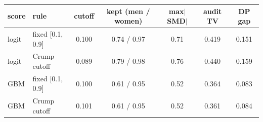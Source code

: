 \begin{tabular}{llccccc}
\toprule
score & rule & cutoff & kept (men / women) & max$|$SMD$|$ & audit TV & DP gap \\
\midrule
logit & fixed $[$0.1, 0.9$]$ & 0.100 & 0.74 / 0.97 & 0.71 & 0.419 & 0.151 \\
logit & Crump cutoff & 0.089 & 0.79 / 0.98 & 0.76 & 0.440 & 0.159 \\
GBM & fixed $[$0.1, 0.9$]$ & 0.100 & 0.61 / 0.95 & 0.52 & 0.364 & 0.083 \\
GBM & Crump cutoff & 0.101 & 0.61 / 0.95 & 0.52 & 0.361 & 0.084 \\
\bottomrule
\end{tabular}
